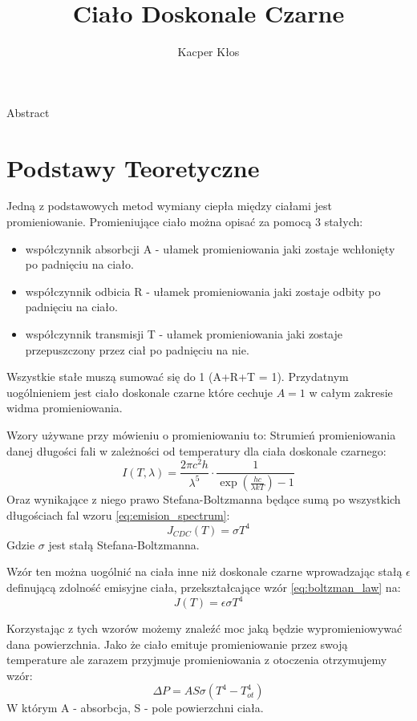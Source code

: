 \documentclass[12pt]{article}
\title{Ciało Doskonale Czarne}
\author{Kacper Kłos}
\begin{document}
\maketitle

Abstract

\newpage
\section{Podstawy Teoretyczne}
Jedną z podstawowych metod wymiany ciepła między ciałami jest promieniowanie.
Promieniujące ciało można opisać za pomocą 3 stałych:
\begin{itemize}
    \item współczynnik absorbcji A - ułamek promieniowania jaki zostaje wchłonięty po padnięciu na ciało.
    \item współczynnik odbicia R - ułamek promieniowania jaki zostaje odbity po padnięciu na ciało.
    \item współczynnik transmisji T - ułamek promieniowania jaki zostaje przepuszczony przez ciał po padnięciu na nie.
\end{itemize}
Wszystkie stałe muszą sumować się do 1 (A+R+T = 1).
Przydatnym uogólnieniem jest ciało doskonale czarne które cechuje $A=1$ w całym zakresie widma promieniowania.

Wzory używane przy mówieniu o promieniowaniu to:
Strumień promieniowania danej długości fali w zależności od temperatury dla ciała doskonale czarnego:
\begin{equation}
    I(T, \lambda) = \frac{2\pi c^2 h}{\lambda^5} \cdot \frac{1}{\exp(\frac{hc}{\lambda k T}) -1}
    \label{eq:emision_spectrum}
\end{equation}
Oraz wynikające z niego prawo Stefana-Boltzmanna będące sumą po wszystkich długościach fal wzoru \ref{eq:emision_spectrum}:
\begin{equation}
    J_{CDC}(T) = \sigma T^4
    \label{eq:boltzman_law}
\end{equation}
Gdzie $\sigma$ jest stałą Stefana-Boltzmanna.

Wzór ten można uogólnić na ciała inne niż doskonale czarne wprowadzając stałą $\epsilon$ definującą zdolność emisyjne ciała, przekształcające wzór \ref{eq:boltzman_law} na:
\begin{equation}
    J(T) = \epsilon \sigma T^4
    \label{eq:boltzman_law_epsilon}
\end{equation}

Korzystając z tych wzorów możemy znaleźć moc jaką będzie wypromieniowywać dana powierzchnia. Jako że ciało emituje promieniowanie przez swoją temperature ale zarazem przyjmuje promieniowania z otoczenia otrzymujemy wzór:
\begin{equation}
    \Delta P = AS \sigma (T^4-T^4_{ot})
    \label{eq:power_loss}
\end{equation}
W którym A - absorbcja, S - pole powierzchni ciała. 
\end{document}

